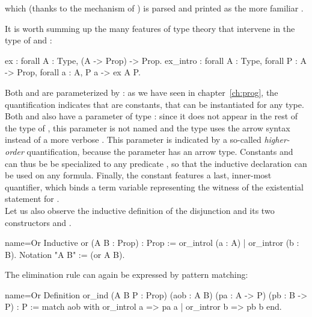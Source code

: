 \centerline{} 
which (thanks to the  mechanism of \Coq{}) is parsed and
printed as the more familiar .

It is worth summing up the many features of type theory that
intervene in the type of  and :

\begin{coq}{}{}
ex : forall A : Type, (A -> Prop) -> Prop.
ex_intro : forall A : Type, forall P : A -> Prop, forall a : A, P a -> ex A P.
\end{coq}

Both  and  are parameterized by : as
we have seen in chapter~\ref{ch:prog}, the 
quantification indicates that  are  
constants, that can be instantiated for any type. Both  and
 also have a parameter of type  : since it
does not appear in the rest of the type of , this parameter is
not named and the type uses the arrow syntax instead of a more verbose
. This parameter is
indicated by a so-called \emph{higher-order} quantification, because
the parameter has an arrow type. Constants   and 
can thus be  be specialized to any predicate , so that the 
inductive declaration can be used on any formula. Finally, the
 constant features a last, inner-most 
quantifier, which binds a term variable  representing the witness
of the existential statement for .\\

Let us also observe the inductive definition of the disjunction 
and its two constructors  and .

\begin{coq}{name=Or}{}
Inductive or (A B : Prop) : Prop := or_introl (a : A) | or_intror (b : B).
Notation "A \/ B" := (or A B).
\end{coq}

The elimination rule can again be expressed by pattern matching:

\begin{coq}{name=Or}{}
Definition or_ind (A B P : Prop)
  (aob : A \/ B) (pa : A -> P) (pb : B -> P) : P :=
  match aob with or_introl a => pa a | or_intror b => pb b end.
\end{coq}

